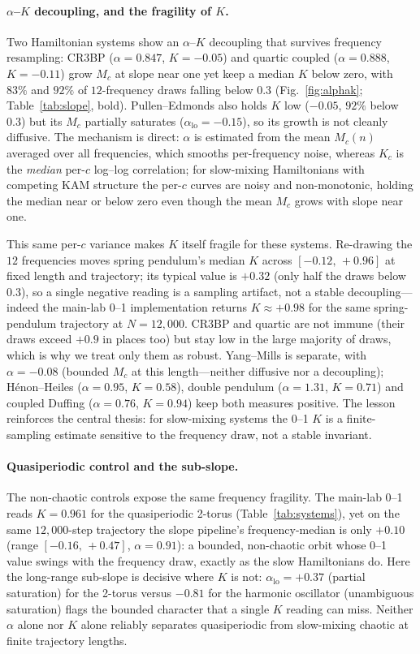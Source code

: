 \documentclass[11pt]{article}
\begin{document}
\paragraph{$\alpha$--$K$ decoupling, and the fragility of $K$.}
Two Hamiltonian systems show an $\alpha$--$K$ decoupling that survives frequency
resampling: CR3BP ($\alpha=0.847$, $K=-0.05$) and quartic coupled ($\alpha=0.888$,
$K=-0.11$) grow $M_c$ at slope near one yet keep a median $K$ below zero, with
$83\%$ and $92\%$ of $12$-frequency draws falling below $0.3$
(Fig.~\ref{fig:alphak}; Table~\ref{tab:slope}, bold). Pullen--Edmonds also holds $K$ low ($-0.05$, $92\%$
below $0.3$) but its $M_c$ partially saturates ($\alpha_{\mathrm{lo}}=-0.15$), so
its growth is not cleanly diffusive. The mechanism is direct: $\alpha$ is
estimated from the mean $M_c(n)$ averaged over all frequencies, which smooths
per-frequency noise, whereas $K_c$ is the \emph{median} per-$c$ log--log
correlation; for slow-mixing Hamiltonians with competing KAM structure the
per-$c$ curves are noisy and non-monotonic, holding the median near or below zero
even though the mean $M_c$ grows with slope near one.

This same per-$c$ variance makes $K$ itself fragile for these systems. Re-drawing
the $12$ frequencies moves spring pendulum's median $K$ across $[-0.12,\,+0.96]$
at fixed length and trajectory; its typical value is $+0.32$ (only half the draws
below $0.3$), so a single negative reading is a sampling artifact, not a stable
decoupling---indeed the main-lab 0--1 implementation returns $K\approx+0.98$ for
the same spring-pendulum trajectory at $N=12{,}000$. CR3BP and
quartic are not immune (their draws exceed $+0.9$ in places too) but stay low in
the large majority of draws, which is why we treat only them as robust.
Yang--Mills is separate, with $\alpha=-0.08$ (bounded $M_c$ at this length---neither
diffusive nor a decoupling); H\'{e}non--Heiles ($\alpha=0.95$, $K=0.58$), double
pendulum ($\alpha=1.31$, $K=0.71$) and coupled Duffing ($\alpha=0.76$, $K=0.94$)
keep both measures positive. The lesson reinforces the central thesis: for
slow-mixing systems the 0--1 $K$ is a finite-sampling estimate sensitive to the
frequency draw, not a stable invariant.

\paragraph{Quasiperiodic control and the sub-slope.}
The non-chaotic controls expose the same frequency fragility. The main-lab 0--1
reads $K=0.961$ for the quasiperiodic 2-torus (Table~\ref{tab:systems}), yet on the
same $12{,}000$-step trajectory the slope pipeline's frequency-median is only
$+0.10$ (range $[-0.16,\,+0.47]$, $\alpha=0.91$): a bounded, non-chaotic orbit
whose 0--1 value swings with the frequency draw, exactly as the slow Hamiltonians
do. Here the long-range sub-slope is decisive where $K$ is not:
$\alpha_{\mathrm{lo}}=+0.37$ (partial saturation) for the 2-torus versus $-0.81$
for the harmonic oscillator (unambiguous saturation) flags the bounded character
that a single $K$ reading can miss. Neither $\alpha$ alone nor $K$ alone reliably
separates quasiperiodic from slow-mixing chaotic at finite trajectory lengths.
\end{document}
